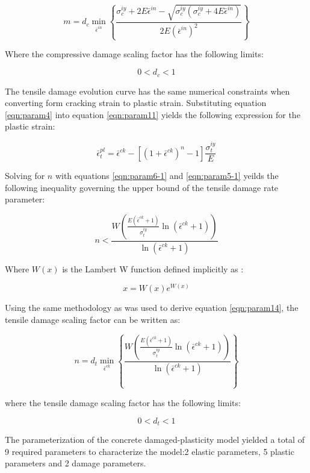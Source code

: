 \begin{equation}
m=d_{c}\min_{\bar{\epsilon}^{in}}\left\{\frac{\sigma_{c}^{iy}+2E\bar{\epsilon}^{in}-\sqrt{\sigma_{c}^{iy}\left(\sigma_{c}^{iy}+4E\bar{\epsilon}^{in}\right)}}{2E\left(\bar{\epsilon}^{in}\right)^{2}}\right\}
\label{eqn:param14}
\end{equation}


Where the compressive damage scaling factor has the following limits:

\begin{equation}
0<d_{c}<1\label{eqn:param15}
\end{equation}


The tensile damage evolution curve has the same numerical constraints when converting form cracking strain to plastic strain. Substituting equation \ref{eqn:param4} into equation \ref{eqn:param11} yields the following expression for the plastic strain:

\begin{equation}
\bar{\epsilon}_{t}^{pl}=\bar{\epsilon}^{ck}-\left[\left(1+\bar{\epsilon}^{ck}\right)^{n}-1\right]\frac{\sigma_{t}^{iy}}{E}\label{eqn:param5-1}
\end{equation}


Solving for $n$ with equations \ref{eqn:param6-1} and \ref{eqn:param5-1} yeilds the following inequality governing the upper bound of the tensile damage rate parameter:

\begin{equation}
n<\frac{W\left(\frac{E\left(\bar{\epsilon}^{ck}+1\right)}{\sigma_{t}^{iy}}\ln\left(\bar{\epsilon}^{ck}+1\right)\right)}{\ln\left(\bar{\epsilon}^{ck}+1\right)}\label{eqn:param7}
\end{equation}

Where $W\left(x\right)$ is the Lambert W function defined implicitly as \cite{Corless_1996}:

\begin{equation}
x=W\left(x\right)e^{W(x)}\label{eqn:param8}
\end{equation}

Using the same methodology as was used to derive equation \ref{eqn:param14}, the tensile damage scaling factor can be written as:


\begin{equation}
n=d_{t}\min_{\bar{\epsilon}^{ck}}\left\{\frac{W\left(\frac{E\left(\bar{\epsilon}^{ck}+1\right)}{\sigma_{t}^{iy}}\ln\left(\bar{\epsilon}^{ck}+1\right)\right)}{\ln\left(\bar{\epsilon}^{ck}+1\right)}\right\}
\label{eqn:param9}
\end{equation}


where the tensile damage scaling factor has the following limits:

\begin{equation}
0<d_{t}<1\label{eqn:param10}
\end{equation}

The parameterization of the concrete damaged-plasticity model yielded a total of 9 required parameters to characterize the model:2 elastic parameters, 5 plastic parameters and 2 damage parameters. 
